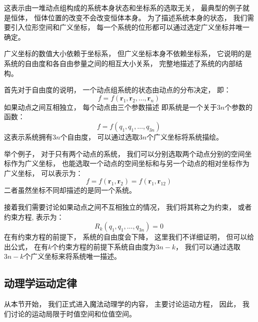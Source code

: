 \documentclass[UTF8,12pt]{ctexart}
\begin{document}
            这表示由一堆动点组构成的系统本身状态和坐标系的选取无关，
            最典型的例子就是恒体，
            恒体位置的改变不会改变恒体本身。
            为了描述系统本身的状态，
            我们需要引入位形空间和广义坐标，
            每一个系统的位形都可以通过选定广义坐标并唯一确定。
            
            广义坐标的数值大小依赖于坐标系，
            但广义坐标本身不依赖坐标系，
            它说明的是系统的自由度和各自由参量之间的相互大小关系，
            完整地描述了系统的内部结构。

            首先对于自由度的说明，
            一个动点组系统的状态由动点的分布决定，
            即：
            \begin{equation}
                f=f(\textbf{r}_1,\textbf{r}_2,\dots,\textbf{r}_n)
            \end{equation}
            如果动点之间互相独立，
            每个动点由三个参数描述
            即系统是一个关于$3n$个参数的函数：
            \begin{equation}
                f=f(q_1,q_1,\dots,q_{3n})
            \end{equation}
            这表示系统拥有$3n$个自由度，
            可以通过选取$3n$个广义坐标将系统描绘。

            举个例子，
            对于只有两个动点的系统，
            我们可以分别选取两个动点分别的空间坐标作为广义坐标，
            也能选取一个动点的空间坐标和与另一个动点的相对坐标作为广义坐标，
            可以表示为：
            \begin{equation}
                f=f(\textbf{r}_1,\textbf{r}_2)=f(\textbf{r}_1,\textbf{r}_{12})
            \end{equation}
            二者虽然坐标不同却描述的是同一个系统。

            接着我们需要讨论如果动点之间不互相独立的情况，
            我们将其称之为约束，
            或者约束方程,
            表示为：
            \begin{equation}
                R_k(q_1,q_1,\dots,q_{3n})=0
            \end{equation}
            在有约束方程的前提下，
            系统的自由度会下降，
            这里我们不详细证明，
            但可以给出公式，
            在有$k$个约束方程的前提下系统自由度为$3n-k$，
            我们可以通过选取$3n-k$个广义坐标来将系统唯一描述。
        \subsection{动理学运动定律}
            从本节开始，
            我们正式进入魔法动理学的内容，
            主要讨论运动方程，
            因此，
            我们讨论的运动局限于时值空间和位值空间。
\end{document}
